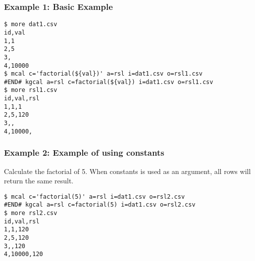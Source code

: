 \subsubsection*{Example 1: Basic Example}



\begin{Verbatim}[baselinestretch=0.7,frame=single]
$ more dat1.csv
id,val
1,1
2,5
3,
4,10000
$ mcal c='factorial(${val})' a=rsl i=dat1.csv o=rsl1.csv
#END# kgcal a=rsl c=factorial(${val}) i=dat1.csv o=rsl1.csv
$ more rsl1.csv
id,val,rsl
1,1,1
2,5,120
3,,
4,10000,
\end{Verbatim}
\subsubsection*{Example 2: Example of using constants}

Calculate the factorial of 5. When constants is used as an argument, all rows will return the same result.


\begin{Verbatim}[baselinestretch=0.7,frame=single]
$ mcal c='factorial(5)' a=rsl i=dat1.csv o=rsl2.csv
#END# kgcal a=rsl c=factorial(5) i=dat1.csv o=rsl2.csv
$ more rsl2.csv
id,val,rsl
1,1,120
2,5,120
3,,120
4,10000,120
\end{Verbatim}
